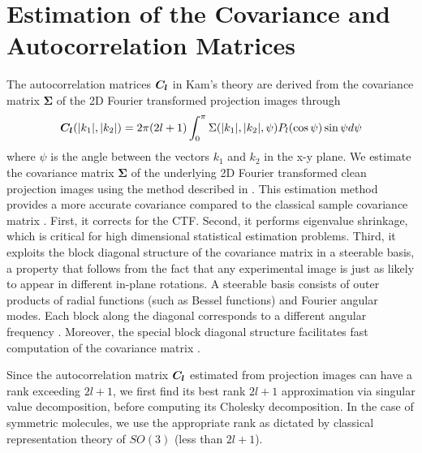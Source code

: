 \section{Estimation of the Covariance and Autocorrelation Matrices}
\label{Sec:oeat_algo}
The autocorrelation matrices $\boldsymbol{C}_{\boldsymbol{l}}$ in Kam's theory are derived from the covariance matrix $\boldsymbol{\Sigma}$ of the 2D Fourier transformed projection images through \cite{kam1980}
\begin{equation}\label{eq:kam_cl}
{\boldsymbol{C}}_{\boldsymbol{l}} (|k_1|,|k_2|) = 2\pi(2l+1) \int_0^\pi {{\Sigma}}(|k_1|,|k_2|,\psi) P_l(\cos{\psi}) \sin{\psi} d\psi
\end{equation}
where $\psi$ is the angle between the vectors $k_1$ and $k_2$ in the x-y plane.
We estimate the covariance matrix $\boldsymbol{\Sigma}$ of 
the underlying 2D Fourier transformed clean projection images using the method described in
\cite{Bhamre2016}. This estimation method provides a more accurate covariance compared to the classical sample covariance matrix \cite{vanHeel1981, vanHeel1984}. First, it corrects for the CTF. Second, it performs eigenvalue shrinkage, which is critical for high dimensional statistical estimation problems. Third, it exploits the block diagonal structure of the covariance matrix in a steerable basis, a property that follows from the fact that any experimental image is just as likely to appear in different in-plane rotations. A steerable basis consists of outer products of radial functions (such as Bessel functions) and Fourier angular modes. Each block along the diagonal corresponds to a different angular frequency \cite{Zhao1}. Moreover, the special block diagonal structure facilitates fast computation of the covariance matrix \cite{Zhao2016}.

Since the autocorrelation matrix $\boldsymbol{C}_{\boldsymbol{l}}$ estimated from projection images can have a rank exceeding $2l+1$, we first find its best rank $2l+1$ approximation via singular value decomposition, before computing its Cholesky decomposition. In the case of symmetric molecules, we use the appropriate rank as dictated by classical representation theory of $SO(3)$ \cite{Klein1914, cheng2013random} (less than $2l+1$).


